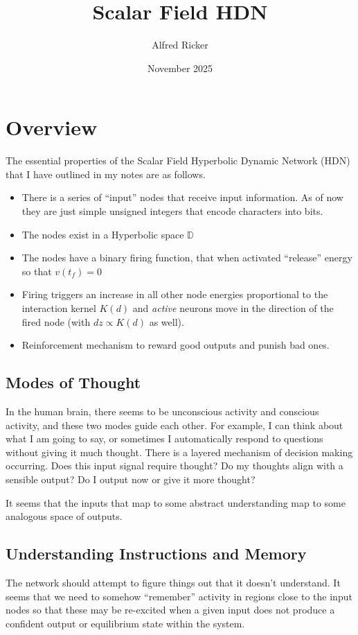 \documentclass{article}
\title{Scalar Field HDN}
\author{Alfred Ricker}
\date{November 2025}
\begin{document}
\maketitle

\section{Overview}
The essential properties of the Scalar Field Hyperbolic Dynamic Network (HDN) that I have outlined in my notes are as follows.
\begin{itemize}
    \item There is a series of ``input'' nodes that receive input information. As of now they are just simple unsigned integers that encode characters into bits.
    \item The nodes exist in a Hyperbolic space $\mathbb{D}$
    \item The nodes have a binary firing function, that when activated ``release'' energy so that $v(t_f) = 0$
    \item Firing triggers an increase in all other node energies proportional to the interaction kernel $K(d)$ and \textit{active} neurons move in the direction of the fired node (with $dz \propto K(d)$ as well). 
    \item Reinforcement mechanism to reward good outputs and punish bad ones.
\end{itemize}

\subsection{Modes of Thought}
In the human brain, there seems to be unconscious activity and conscious activity, and these two modes guide each other. For example, I can think about what I am going to say, or sometimes I automatically respond to questions without giving it much thought. There is a layered mechanism of decision making occurring. Does this input signal require thought? Do my thoughts align with a sensible output? Do I output now or give it more thought?

It seems that the inputs that map to some abstract understanding map to some analogous space of outputs.

\subsection{Understanding Instructions and Memory}
The network should attempt to figure things out that it doesn't understand. It seems that we need to somehow ``remember'' activity in regions close to the input nodes so that these may be re-excited when a given input does not produce a confident output or equilibrium state within the system. \\
\end{document}
